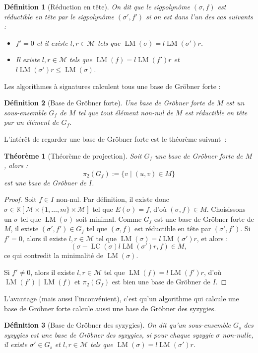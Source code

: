 \documentclass{article}
\newtheorem*{thm}{Théorème}
\newtheorem*{dfn}{Définition}
\newcommand{\K}{\mathbb{K}}
\newcommand{\M}{\mathcal{M}}
\newcommand{\CR}{\K[\M\times\{1, \dots, m\}\times\M]}
\DeclareMathOperator{\LM}{LM}
\DeclareMathOperator{\LC}{LC}
\begin{document}
\begin{dfn}[Réduction en tête]
	On dit que le sigpolynôme $(\sigma, f)$ est réductible en tête par le sigpolynôme $(\sigma', f')$ si on est dans l'un des cas suivants :
	\begin{itemize}
	\item $f' = 0$ et il existe $l, r \in \M$ tels que $\LM(\sigma) = l\LM(\sigma')r$.
	\item Il existe $l, r \in \M$ tels que $\LM(f) = l\LM(f')r$ et $l\LM(\sigma')r \leq \LM(\sigma)$.
	\end{itemize}
\end{dfn}

Les algorithmes à signatures calculent tous une base de Gröbner forte :

\begin{dfn}[Base de Gröbner forte]
	Une base de Gröbner forte de $M$ est un sous-ensemble $G_f$ de $M$ tel que tout élément non-nul de $M$ est réductible en tête par un élément de $G_f$.
\end{dfn}

L'intérêt de regarder une base de Gröbner forte est le théorème suivant~:

\begin{thm}[Théorème de projection]
	Soit $G_f$ une base de Gröbner forte de $M$, alors :
	$$\pi_2(G_f) := \{v \;|\; (u, v) \in M\}$$
	est une base de Gröbner de $I$.
\end{thm}
\begin{proof}
	Soit $f \in I$ non-nul. Par définition, il existe donc $\sigma \in \CR$ tel que $E(\sigma) = f$, d'où $(\sigma, f) \in M$. Choisissons un $\sigma$ tel que $\LM(\sigma)$ soit minimal.
	Comme $G_f$ est une base de Gröbner forte de $M$, il existe $(\sigma', f') \in G_f$ tel que $(\sigma, f)$ est réductible en tête par $(\sigma', f')$.
	Si $f' = 0$, alors il existe $l, r \in \M$ tel que $\LM(\sigma) = l\LM(\sigma')r$, et alors :
	$$(\sigma - \LC(\sigma)l\LM(\sigma')r, f) \in M,$$
	ce qui contredit la minimalité de $\LM(\sigma)$.
	
	Si $f' \neq 0$, alors il existe $l, r \in \M$ tel que $\LM(f) = l\LM(f')r$, d'où $\LM(f') \;|\; \LM(f)$ et $\pi_2(G_f)$ est bien une base de Gröbner de $I$.
\end{proof}

L'avantage (mais aussi l'inconvénient), c'est qu'un algorithme qui calcule une base de Gröbner forte calcule aussi une base de Gröbner des syzygies.

\begin{dfn}[Base de Gröbner des syzygies]
	On dit qu'un sous-ensemble $G_s$ des syzygies est une base de Gröbner des syzygies, si pour chaque syzygie $\sigma$ non-nulle, il existe $\sigma' \in G_s$ et $l, r \in \M$ tels que $\LM(\sigma) = l\LM(\sigma')r$.
\end{dfn}
\end{document}
